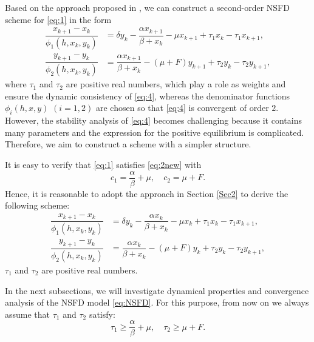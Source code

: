 \documentclass[12pt]{article}
\theoremstyle{definition}
\theoremstyle{remark}
\numberwithin{equation}{section}
\begin{document}
Based on the approach proposed in \cite{HoangMatthias2}, we can construct a second-order NSFD scheme for \eqref{eq:1} in the form
\begin{equation}\label{eq:4}
\begin{split}
\dfrac{x_{k+1}- x_k}{\phi_1(h, x_k, y_k)} &= \delta y_k - \dfrac{\alpha x_{k+1}}{\beta + x_k}- \mu x_{k + 1} + \tau_1x_k - \tau_1x_{k+1}, \\
\dfrac{y_{k+1} - y_k}{\phi_2(h, x_k, y_k)} &= \dfrac{\alpha x_{k + 1}}{\beta + x_k} - (\mu+F) y_{k+1} + \tau_2y_k - \tau_2y_{k+1},
\end{split}
\end{equation}
%
where $\tau_1$ and $\tau_2$ are positive real numbers, which play a role as weights and ensure the dynamic consistency of \eqref{eq:4}, whereas the denominator functions $\phi_i(h, x, y)$ $(i = 1, 2)$ are chosen so that \eqref{eq:4} is convergent of order $2$. However, the stability analysis of \eqref{eq:4} becomes challenging because it contains many parameters and the expression for the positive equilibrium is complicated. Therefore, we aim to construct a scheme with a simpler structure. 


It is easy to verify that \eqref{eq:1} satisfies \eqref{eq:2new} with
\begin{equation*}
c_1 = \dfrac{\alpha}{\beta} + \mu, \quad c_2 = \mu + F.
\end{equation*}
Hence, it is reasonable to adopt the approach in Section \ref{Sec2} to derive the following scheme:
\begin{equation}\label{eq:NSFD}
\begin{split}
\dfrac{x_{k+1}- x_k}{\phi_1(h, x_k, y_k)} &= \delta y_k - \dfrac{\alpha x_{k}}{\beta + x_k}- \mu x_{k} + \tau_1x_k - \tau_1x_{k+1}, \\
\dfrac{y_{k+1} - y_k}{\phi_2(h, x_k, y_k)} &= \dfrac{\alpha x_{k}}{\beta + x_k} - (\mu+F) y_{k} + \tau_2y_k - \tau_2y_{k+1},
\end{split}
\end{equation}
$\tau_1$ and $\tau_2$ are positive real numbers.

%
%
%
In the next subsections, we will investigate dynamical properties and convergence analysis of the NSFD model \eqref{eq:NSFD}.  For this purpose, from now on we always assume that $\tau_1$ and $\tau_2$ satisfy:
\begin{equation}\label{eq:6}
\tau_1 \geq \dfrac{\alpha}{\beta} + \mu, \quad \tau_2 \geq \mu + F.
\end{equation}
\end{document}
